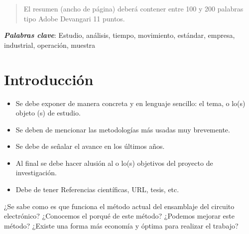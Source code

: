 

\begin{abstract}
\noindent 
El resumen (ancho de página) deberá contener entre 100 y 200 palabras tipo Adobe Devangari 11 puntos.

\end{abstract}
% 
% 
\textbf{\textit{Palabras clave}}: {Estudio, análisis, tiempo, movimiento, estándar, empresa, industrial, operación, muestra}

\section{Introducción}

\begin{itemize}
    \item Se debe exponer de manera concreta y en lenguaje sencillo: el tema, o lo(s) objeto (s) de estudio. 
    \item Se deben de mencionar las metodologías más usadas muy brevemente. 
    \item Se debe de señalar el avance en los últimos años.
    \item Al final se debe hacer alusión al o lo(s) objetivos del proyecto de investigación.
    \item Debe de tener Referencias científicas, URL, tesis, etc.
\end{itemize}


¿Se sabe como es que funciona el método actual del ensamblaje del circuito electrónico? ¿Conocemos el porqué de este método? ¿Podemos mejorar este método? ¿Existe una forma más economía y óptima para realizar el trabajo?

